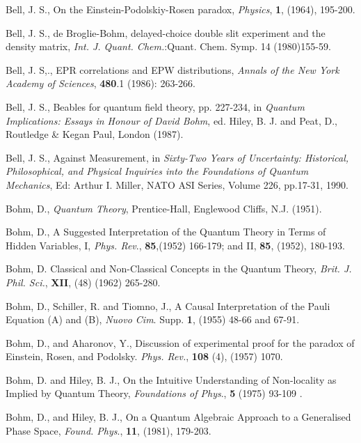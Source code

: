 \documentclass[12pt]{article}
\begin{document}
\begin{thebibliography}{99}


 Bell, J. S., On the Einstein-Podolskiy-Rosen paradox, {\em Physics}, {\bf 1}, (1964), 195-200.

 Bell, J. S., de Broglie-Bohm, delayed-choice double slit experiment and the density matrix, {\em Int. J. Quant. Chem.}:Quant. Chem. Symp. 14 (1980)155-59.

  Bell, J. S,., EPR correlations and EPW distributions, {\em Annals of the New York Academy of Sciences}, {\bf 480}.1 (1986): 263-266.  

 Bell, J. S., Beables for quantum field theory, pp. 227-234, in   {\em Quantum Implications: Essays in Honour of David Bohm}, ed. Hiley, B. J. and Peat, D., Routledge \& Kegan Paul, London (1987).

 Bell, J. S., Against Measurement, in {\em Sixty-Two Years of Uncertainty: Historical, Philosophical, and Physical Inquiries into the Foundations of Quantum Mechanics}, Ed: Arthur I. Miller, NATO ASI Series, Volume 226, pp.17-31, 1990.

 Bohm, D., {\em Quantum Theory}, Prentice-Hall, Englewood Cliffs, N.J. (1951).

 Bohm, D., A Suggested Interpretation of the Quantum Theory in Terms of Hidden Variables, I, {\em Phys. Rev}., {\bf 85},(1952) 166-179; and II, {\bf 85}, (1952), 180-193.

 Bohm, D.  Classical and Non-Classical Concepts in the Quantum Theory, {\em Brit. J. Phil.  Sci.}, {\bf XII},  (48) (1962) 265-280.

 Bohm, D., Schiller, R. and Tiomno, J., A Causal Interpretation of the Pauli Equation (A) and (B), {\em Nuovo Cim}. Supp. {\bf 1}, (1955) 48-66 and 67-91.

 Bohm, D., and  Aharonov, Y., Discussion of experimental proof for the paradox of Einstein, Rosen, and Podolsky. {\em Phys. Rev.}, {\bf 108} (4),  (1957) 1070.

  Bohm, D. and Hiley, B. J.,  On the Intuitive Understanding of Non-locality as Implied by Quantum Theory,   {\em Foundations of Phys}., {\bf 5} (1975) 93-109 .

 Bohm, D., and Hiley, B. J., On a Quantum Algebraic Approach to a Generalised Phase Space, {\em Found. Phys}., {\bf 11}, (1981), 179-203.


\end{thebibliography}
\end{document}
